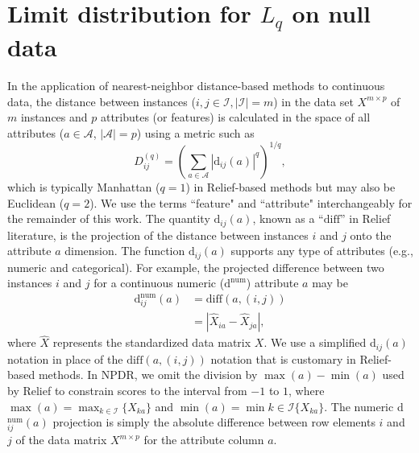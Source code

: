 \documentclass[aoas]{imsart}
\begin{document}
\section{Limit distribution for \texorpdfstring{$L_q$}{} on null data}\label{sec:notation_and_CLT}
In the application of nearest-neighbor distance-based methods to continuous data, the distance between instances ($i,j \in \mathcal{I}, |\mathcal{I}|=m$) in the data set $X^{m \times p}$ of $m$ instances and $p$ attributes (or features) is calculated in the space of all attributes ($a \in \mathcal{A}$, $|\mathcal{A}|=p$) using a metric such as
\begin{equation}\label{eq:D}
D^{(q)}_{ij}=\left(\sum_{a\in \mathcal{A}}|\text{d}_{ij}(a)|^q\right)^{1/q},
\end{equation}
which is typically Manhattan ($q=1$) in Relief-based methods but may also be Euclidean ($q=2$). We use the terms ``feature" and ``attribute" interchangeably for the remainder of this work. The quantity 
$\text{d}_{ij}(a)$,
known as a ``$\text{diff}$'' in Relief literature, is the projection of the distance between instances $i$ and $j$ onto the attribute $a$ dimension. The 
function $\text{d}_{ij}(a)$ supports any type of attributes
(e.g., numeric and categorical).
For example, the projected difference between two instances $i$ and $j$ for a continuous numeric ($\text{d}^{\text{num}}$) attribute $a$ may be
\begin{equation}\label{eq:diff}
\begin{aligned}
\text{d}^{\text{num}}_{ij}(a)&=\text{diff}(a,(i,j))\\
& = {|\hat{X}_{ia}-\hat{X}_{ja}|},
\end{aligned}
\end{equation}
where $\hat{X}$ represents the standardized data matrix $X$.
We use a simplified d$_{ij}(a)$ notation in place of the $\text{diff}(a,(i,j))$ notation that is customary in Relief-based methods.
In NPDR, we omit the division by $\max(a)-\min(a)$ used by Relief to constrain scores to the interval from $-1$ to $1$, where $\max(a) = \max_{k \in \mathcal{I}}\{X_{ka}\}$ and $\min(a) = \min{k \in \mathcal{I}}\{X_{ka}\}$. The numeric d$^{\text{num}}_{ij}(a)$ projection is simply the absolute difference between row elements $i$ and $j$ of the data matrix $X^{m \times p}$ for the attribute column $a$. 
\end{document}
